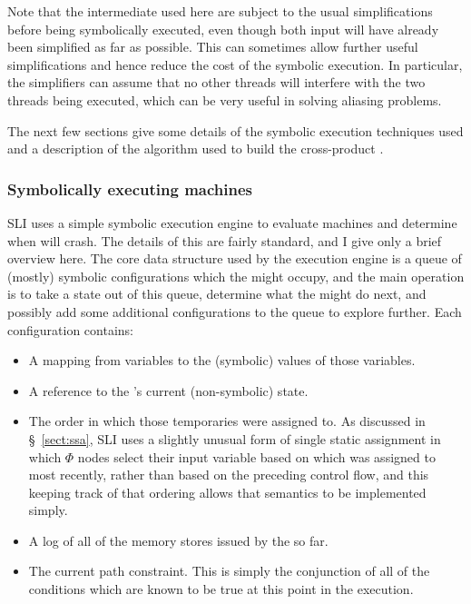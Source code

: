 Note that the intermediate {\StateMachines} used here are subject to
the usual simplifications before being symbolically executed, even
though both input {\StateMachines} will have already been simplified
as far as possible.  This can sometimes allow further useful
simplifications and hence reduce the cost of the symbolic execution.
In particular, the simplifiers can assume that no other threads will
interfere with the two threads being executed, which can be very
useful in solving aliasing problems.

The next few sections give some details of the symbolic execution
techniques used and a description of the algorithm used to build the
cross-product {\StateMachine}.

\subsubsection{Symbolically executing machines}

SLI uses a simple symbolic execution engine to evaluate machines and
determine when {\StateMachines} will crash.  The details of this are
fairly standard, and I give only a brief overview
here.  The core data structure
used by the execution engine is a queue of (mostly) symbolic
configurations which the {\StateMachine} might occupy, and the main
operation is to take a state out of this queue, determine what the
\StateMachine might do next, and possibly add some additional
configurations to the queue to explore further.  Each configuration
contains:

\begin{itemize}
\item
  A mapping from {\StateMachine} variables to the (symbolic) values of
  those variables.
\item
  A reference to the {\StateMachine}'s current (non-symbolic) state.
\item
  The order in which those temporaries were assigned to.  As discussed
  in \S~\ref{sect:ssa}, SLI uses a slightly unusual form of single
  static assignment in which $\Phi$ nodes select their input variable
  based on which was assigned to most recently, rather than based on
  the preceding control flow, and this keeping track of that ordering
  allows that semantics to be implemented simply.
\item
  A log of all of the memory stores issued by the \StateMachine so far.
\item
  The current path constraint.  This is simply the conjunction of all
  of the conditions which are known to be true at this point in the
  execution.
\end{itemize}

